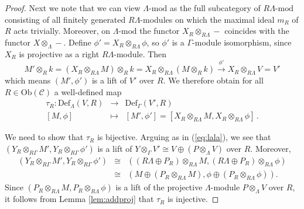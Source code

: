 \documentclass{amsart}
\theoremstyle{plain}
\theoremstyle{definition}
\theoremstyle{remark}
\begin{document}
\begin{proof}
Next we note that we can view $\Lambda\mbox{-mod}$ as the full subcategory of $R\Lambda\mbox{-mod}$
consisting of all finitely generated $R\Lambda$-modules on which the maximal ideal $m_R$ of $R$ acts 
trivially. Moreover, on $\Lambda\mbox{-mod}$ the functor $X_R\otimes_{R\Lambda} -$
coincides with the functor $X\otimes_{\Lambda} -$.
Define $\phi'=X_R\otimes_{R\Lambda}\phi$, so $\phi'$ is a $\Gamma$-module isomorphism, since
$X_R$ is projective as a right $R\Lambda$-module. 
Then
\begin{equation}
\label{eq:lala}
M'\otimes_Rk=(X_R\otimes_{R\Lambda}M)\otimes_Rk = X_R\otimes_{R\Lambda}(M\otimes_Rk)
\xrightarrow{\phi'} X_R\otimes_{R\Lambda}V =V'
\end{equation}
which means $(M',\phi')$ is a lift of $V'$ over $R$. We therefore obtain for all $R\in\mathrm{Ob}(\mathcal{C})$ a well-defined map 
\begin{eqnarray*}
\tau_R:\mathrm{Def}_\Lambda(V,R)&\to&\mathrm{Def}_\Gamma(V',R)\\
{[M,\phi]}&\mapsto&[M',\phi']=[X_R\otimes_{R\Lambda}M,X_R\otimes_{R\Lambda}\phi]\,.
\end{eqnarray*}

We need to show that $\tau_R$ is bijective.
Arguing as in (\ref{eq:lala}), we see that $(Y_R\otimes_{R\Gamma}M',Y_R\otimes_{R\Gamma}\phi')$
is a lift of $Y\otimes_\Gamma V'\cong V \oplus (P\otimes_\Lambda V)$ over $R$. Moreover, 
\begin{eqnarray}
\label{eq:olala}
(Y_R\otimes_{R\Gamma}M',Y_R\otimes_{R\Gamma}\phi')
&\cong&((R\Lambda\oplus P_R)\otimes_{R\Lambda}M, (R\Lambda\oplus P_R)\otimes_{R\Lambda}\phi) \\
&\cong&(M\oplus (P_R\otimes_{R\Lambda}M), \phi\oplus(P_R\otimes_{R\Lambda}\phi)). \nonumber
\end{eqnarray}
Since $(P_R\otimes_{R\Lambda}M,P_R\otimes_{R\Lambda}\phi)$ is
a lift of the projective $\Lambda$-module $P\otimes_\Lambda V$ over $R$,
it follows from Lemma \ref{lem:addproj} that $\tau_R$ is injective.


\end{proof}
\end{document}
